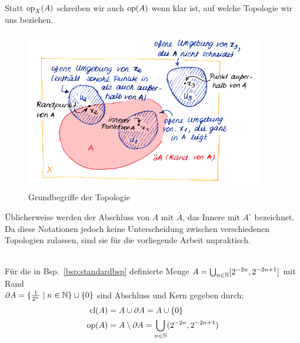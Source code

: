     \begin{konv}
        Statt $\text{op}_X(A)$ schreiben wir auch $\text{op}(A)$ wenn klar ist, auf welche Topologie wir uns beziehen.
    \end{konv}

    \begin{figure}[ht]
        \centering
        \includegraphics[height=7cm]{bearbeitet-22-04-25/top-grundbegr.png}
        \caption{Grundbegriffe der Topologie}
        \label{fig:top-grundbegr}
    \end{figure}


    \begin{bem}
        Üblicherweise werden der Abschluss von $A$ mit $\bar A$, das Innere mit $A^\circ$ bezeichnet. Da diese Notationen jedoch keine Unterscheidung zwischen verschiedenen Topologien zulassen, sind sie für die vorliegende Arbeit unpraktisch.
    \end{bem}
    
    \begin{bsp}\label{bsp:standardbsp-abschl-kern}\ \\
        Für die in Bsp.\ \ref{bsp:standardbsp} definierte Menge ${A = \bigcup_{n \in \mathbb{N}} [2^{-2n}, 2^{-2n+1}]}$ mit Rand\\${\partial A = \{\frac{1}{2^n} \mid n \in \mathbb{N}\} \cup \{0\}}$ sind Abschluss und Kern gegeben durch:
        \begin{align*}
            \text{cl}(A) &= A \cup \partial A = A \cup \{0\}\\
            \text{op}(A) &= A \setminus \partial A = \bigcup_{n \in \mathbb{N}} (2^{-2n}, 2^{-2n+1})
        \end{align*}
    \end{bsp}

